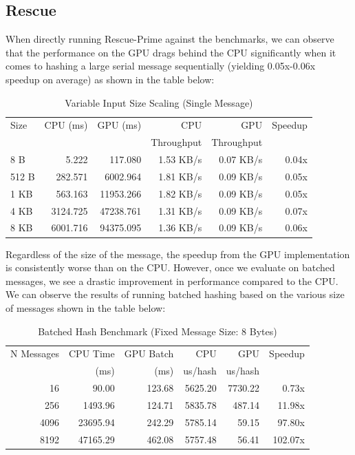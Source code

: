 \documentclass[conference]{IEEEtran}
\begin{document}
\subsection{Rescue}

When directly running Rescue-Prime against the benchmarks, we can observe that the performance on the GPU drags behind the CPU significantly when it comes to hashing a large serial message sequentially (yielding 0.05x-0.06x speedup on average) as shown in the table below:

\begin{table}[h]
\centering
\footnotesize
\caption{Variable Input Size Scaling (Single Message)}
\begin{tabular}{|l|r|r|r|r|r|}
\hline
Size & CPU (ms) & GPU (ms) & CPU & GPU & Speedup \\
& & & Throughput & Throughput & \\
\hline
8 B   & 5.222    & 117.080   & 1.53 KB/s & 0.07 KB/s & 0.04x \\
512 B & 282.571  & 6002.964  & 1.81 KB/s & 0.09 KB/s & 0.05x \\
1 KB  & 563.163  & 11953.266 & 1.82 KB/s & 0.09 KB/s & 0.05x \\
4 KB  & 3124.725 & 47238.761 & 1.31 KB/s & 0.09 KB/s & 0.07x \\
8 KB  & 6001.716 & 94375.095 & 1.36 KB/s & 0.09 KB/s & 0.06x \\
\hline
\end{tabular}
\label{tab:exp2}
\end{table}

Regardless of the size of the message, the speedup from the GPU implementation is consistently worse than on the CPU. However, once we evaluate on batched messages, we see a drastic improvement in performance compared to the CPU. We can observe the results of running batched hashing based on the various size of messages shown in the table below:

\begin{table}[h]
\centering
\footnotesize
\caption{Batched Hash Benchmark (Fixed Message Size: 8 Bytes)}
\begin{tabular}{|r|r|r|r|r|r|}
\hline
N Messages & CPU Time & GPU Batch & CPU & GPU & Speedup \\
& (ms) & (ms) & us/hash & us/hash & \\
\hline
16   & 90.00    & 123.68  & 5625.20 & 7730.22 & 0.73x \\
256  & 1493.96  & 124.71  & 5835.78 & 487.14  & 11.98x \\
4096 & 23695.94 & 242.29  & 5785.14 & 59.15   & 97.80x \\
8192 & 47165.29 & 462.08  & 5757.48 & 56.41   & 102.07x \\
\hline
\end{tabular}
\label{tab:exp1}
\end{table}
\end{document}
